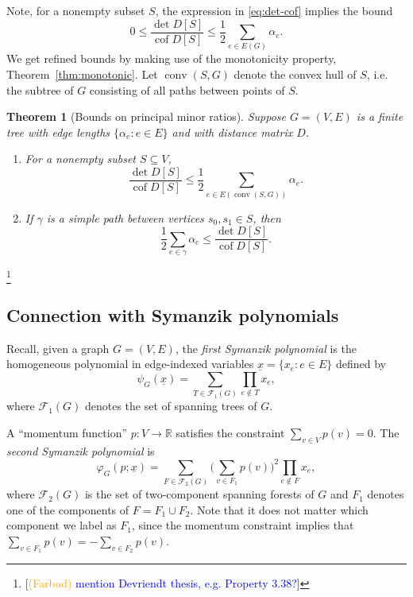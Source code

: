 \documentclass[12pt]{amsart}
\newtheorem{thm}{Theorem}[section]
\theoremstyle{definition}
\newcommand{\RR}{\mathbb{R}}
\newcommand{\Da}{{D}}
\DeclareMathOperator{\cof}{cof}
\DeclareMathOperator{\conv}{conv}
\newcommand{\trees}{\mathcal{F}_1}
\newcommand{\forests}{\mathcal{F}}
\newcommand\farbod[1]{\footnote{[\textcolor{orange}{(Farbod)} \textcolor{blue}{#1}]}}
\begin{document}
Note, for a nonempty subset $S$, the expression in \eqref{eq:det-cof} implies the bound
\begin{equation}
	0 \leq \frac{\det D[S]}{\cof D[S]} \leq \frac12 \sum_{e \in E(G)} \alpha_e .
\end{equation}
We get refined bounds by making use of the monotonicity property, Theorem~\ref{thm:monotonic}. Let $\conv(S,G)$ denote the convex hull of $S$, i.e. the subtree of $G$ consisting of all paths between points of $S$.

\begin{thm}[Bounds on principal minor ratios]
\label{thm:det-cof-bounds}
Suppose $G = (V,E)$ is a finite tree with edge lengths $\{\alpha_e \colon e \in E\}$ and with distance matrix $\Da$.
\begin{enumerate}[label=(\alph*)]
\item 
For a nonempty subset $S \subseteq V$,
\begin{equation*}
	\frac{\det \Da[S]}{\cof \Da[S]} \leq \frac12 \sum_{e \in E(\conv(S, G))} \alpha_e .
\end{equation*}
\item 
If $\gamma$ is a simple path between vertices $s_0, s_1 \in S$, then
\begin{equation*}
	\frac12 \sum_{e \in \gamma} \alpha_e \leq \frac{\det \Da[S]}{\cof \Da[S]}.
\end{equation*}
\end{enumerate}
\end{thm}

 \farbod{mention Devriendt thesis, e.g. Property 3.38?}

\subsection{Connection with Symanzik polynomials}\label{sec:Symanzik}
Recall, given a graph $G = (V, E)$, the {\em first Symanzik polynomial} is the homogeneous polynomial in edge-indexed variables $\underline{x} = \{x_e \colon e \in E\}$ defined by
\[
	\psi_G(\underline{x}) = \sum_{T \in \trees(G)} \prod_{e \not \in T} x_e ,
\]
where $\trees(G)$ denotes the set of spanning trees of $G$.

A ``momentum function'' $p\colon V \to \RR$ satisfies the constraint $\sum_{v \in V} p(v) = 0$. The {\em second Symanzik polynomial} is
\[
	\varphi_G(p; \underline{x}) = \sum_{F \in \forests_2(G)} \Big(\sum_{v \in F_1} p(v) \Big)^2 \prod_{e \not\in F} x_e ,
\]
where $\forests_2(G)$ is the set of two-component spanning forests of $G$ and $F_1$ denotes one of the components of $F = F_1 \cup F_2$.
Note that it does not matter which component we label as $F_1$, since the momentum constraint implies that
$\sum_{v \in F_1} p(v)  = - \sum_{v \in F_2} p(v)$.
\end{document}
